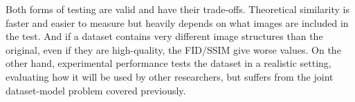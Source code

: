 Both forms of testing are valid and have their trade-offs. Theoretical similarity is faster and easier to measure but heavily depends on what images are included in the test. And if a dataset contains very different image structures than the original, even if they are high-quality, the FID/SSIM give worse values. On the other hand, experimental performance tests the dataset in a realistic setting, evaluating how it will be used by other researchers, but suffers from the joint dataset-model problem covered previously.

